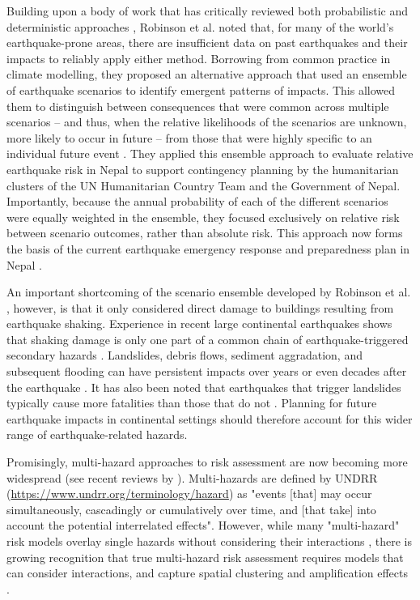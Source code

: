 \documentclass[preprint,12pt,authoryear]{elsarticle}
\begin{document}
Building upon a body of work that has critically reviewed both probabilistic and deterministic approaches \citep{Bommer2002,Wang2003,Wang2011,Bilham2013, klugel_seismic_2008}, Robinson et al. \citep{Robinson2018} noted that, for many of the world's earthquake-prone areas, there are insufficient data on past earthquakes and their impacts to reliably apply either method. Borrowing from common practice in climate modelling, they proposed an alternative approach that used an ensemble of earthquake scenarios to identify emergent patterns of impacts. This allowed them to distinguish between consequences that were common across multiple scenarios -- and thus, when the relative likelihoods of the scenarios are unknown, more likely to occur in future -- from those that were highly specific to an individual future event \citep{Robinson2018}. They applied this ensemble approach to evaluate relative earthquake risk in Nepal to support contingency planning by the humanitarian clusters of the UN Humanitarian Country Team and the Government of Nepal. Importantly, because the annual probability of each of the different scenarios were equally weighted in the ensemble, they focused exclusively on relative risk between scenario outcomes, rather than absolute risk. This approach now forms the basis of the current earthquake emergency response and preparedness plan in Nepal \citep{un_nepal2022earthquake}.

An important shortcoming of the scenario ensemble developed by Robinson et al. \citep{Robinson2018}, however, is that it only considered direct damage to buildings resulting from earthquake shaking. Experience in recent large continental earthquakes shows that shaking damage is only one part of a common chain of earthquake-triggered secondary hazards \citep{Gill2014}. Landslides, debris flows, sediment aggradation, and subsequent flooding can have persistent impacts over years or even decades after the earthquake \citep{Fan2019,Kincey2021, francis_fate_2022}. It has also been noted that earthquakes that trigger landslides typically cause more fatalities than those that do not \citep{Budimir2014}. Planning for future earthquake impacts in continental settings should therefore account for this wider range of earthquake-related hazards.

Promisingly, multi-hazard approaches to risk assessment are now becoming more widespread (see recent reviews by \cite{Gill2022,Ward2022}). Multi-hazards are defined by UNDRR (\url{https://www.undrr.org/terminology/hazard}) as "events [that] may occur simultaneously, cascadingly or cumulatively over time, and [that take] into account the potential interrelated effects". However, while many "multi-hazard" risk models overlay single hazards without considering their interactions \citep{Gill2014}, there is growing recognition that true multi-hazard risk assessment requires models that can consider interactions, and capture spatial clustering and  amplification effects \citep{Mignan2014,Tilloy2019,Dunant2021,Ming2022,Hochrainer-Stigler2023}.
\end{document}
